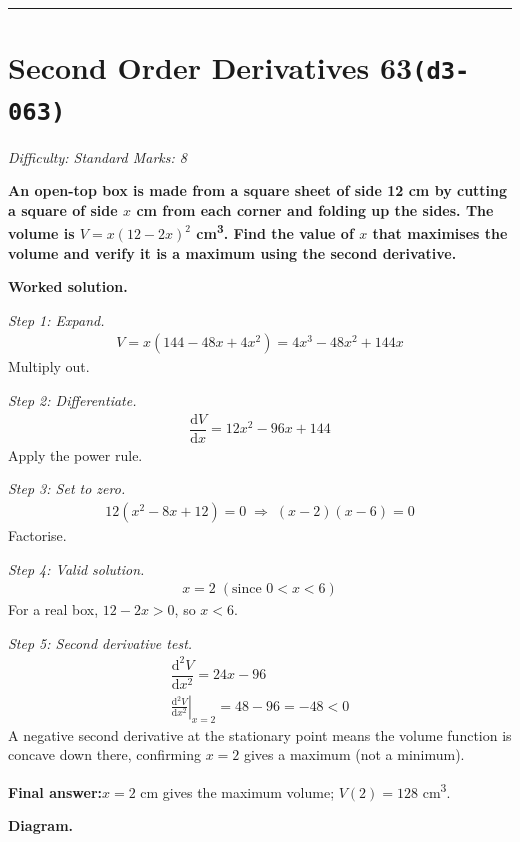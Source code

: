 \documentclass[11pt]{article}
\newcommand{\question}[1]{\par\medskip\noindent\textbf{#1}\par}
\begin{document}
\medskip\hrule

\section*{Second Order Derivatives 63\quad\small\texttt{(d3-063)}}
\textit{Difficulty: Standard \quad\textbar\quad Marks: 8}

\question{An open-top box is made from a square sheet of side 12 cm by cutting a square of side \( x \) cm from each corner and folding up the sides. The volume is \( V = x(12 - 2x)^2 \) cm\textsuperscript{3}. Find the value of \( x \) that maximises the volume and verify it is a maximum using the second derivative.}

\textbf{Worked solution.}

\textit{Step 1: Expand.}
\[\begin{gathered}
V = x(144 - 48x + 4x^2) = 4x^3 - 48x^2 + 144x
\end{gathered}\]
Multiply out.

\textit{Step 2: Differentiate.}
\[\begin{gathered}
\dfrac{\mathrm{d}V}{\mathrm{d}x} = 12x^2 - 96x + 144
\end{gathered}\]
Apply the power rule.

\textit{Step 3: Set to zero.}
\[\begin{gathered}
12(x^2 - 8x + 12) = 0 \;\Rightarrow\; (x-2)(x-6) = 0
\end{gathered}\]
Factorise.

\textit{Step 4: Valid solution.}
\[\begin{gathered}
x = 2 \; (\text{since } 0 < x < 6)
\end{gathered}\]
For a real box, \( 12 - 2x > 0 \), so \( x < 6 \).

\textit{Step 5: Second derivative test.}
\[\begin{gathered}
\dfrac{\mathrm{d}^2V}{\mathrm{d}x^2} = 24x - 96 \\ \left.\tfrac{\mathrm{d}^2V}{\mathrm{d}x^2}\right|_{x=2} = 48 - 96 = -48 < 0
\end{gathered}\]
A negative second derivative at the stationary point means the volume function is concave down there, confirming \(x = 2\) gives a maximum (not a minimum).

\begin{answerbox}
\textbf{Final answer:}\quad \(\displaystyle  x = 2 \) cm gives the maximum volume; \(\displaystyle  V(2) = 128 \) cm\textsuperscript{3}.
\end{answerbox}
\textbf{Diagram.}
\end{document}
